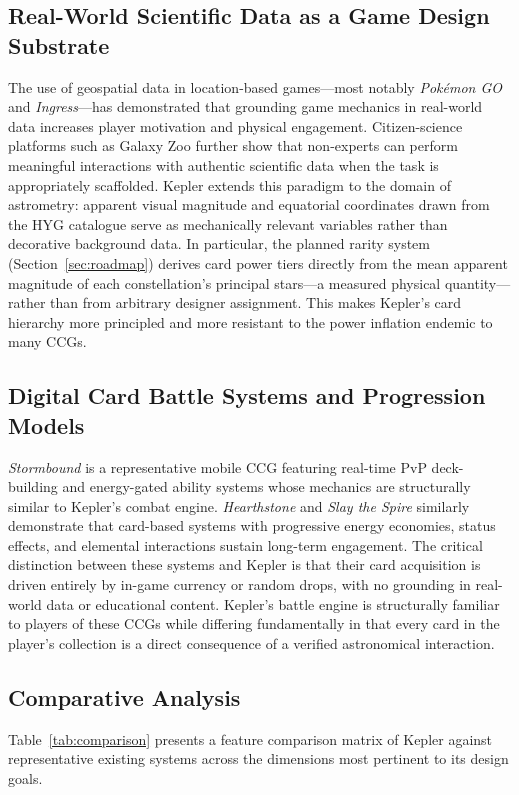 \documentclass[conference]{IEEEtran}
\begin{document}
\subsection{Real-World Scientific Data as a Game Design Substrate}
The use of geospatial data in location-based games---most notably \textit{Pok\'emon GO} \cite{pioneer2016pokemongo} and \textit{Ingress}---has demonstrated that grounding game mechanics in real-world data increases player motivation and physical engagement. Citizen-science platforms such as Galaxy Zoo \cite{lintott2008galaxy} further show that non-experts can perform meaningful interactions with authentic scientific data when the task is appropriately scaffolded. Kepler extends this paradigm to the domain of astrometry: apparent visual magnitude and equatorial coordinates drawn from the HYG catalogue \cite{hyg} serve as mechanically relevant variables rather than decorative background data. In particular, the planned rarity system (Section~\ref{sec:roadmap}) derives card power tiers directly from the mean apparent magnitude of each constellation's principal stars---a measured physical quantity---rather than from arbitrary designer assignment. This makes Kepler's card hierarchy more principled and more resistant to the power inflation endemic to many CCGs.

\subsection{Digital Card Battle Systems and Progression Models}
\textit{Stormbound} \cite{stormbound} is a representative mobile CCG featuring real-time PvP deck-building and energy-gated ability systems whose mechanics are structurally similar to Kepler's combat engine. \textit{Hearthstone} \cite{hearthstone} and \textit{Slay the Spire} \cite{slayspire} similarly demonstrate that card-based systems with progressive energy economies, status effects, and elemental interactions sustain long-term engagement. The critical distinction between these systems and Kepler is that their card acquisition is driven entirely by in-game currency or random drops, with no grounding in real-world data or educational content. Kepler's battle engine is structurally familiar to players of these CCGs while differing fundamentally in that every card in the player's collection is a direct consequence of a verified astronomical interaction.

\subsection{Comparative Analysis}
Table~\ref{tab:comparison} presents a feature comparison matrix of Kepler against representative existing systems across the dimensions most pertinent to its design goals.
\end{document}
